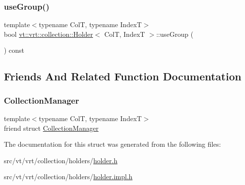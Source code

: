 \subsubsection{\texorpdfstring{use\+Group()}{useGroup()}}
{\footnotesize\ttfamily template$<$typename ColT, typename IndexT$>$ \\
bool \hyperlink{structvt_1_1vrt_1_1collection_1_1_holder}{vt\+::vrt\+::collection\+::\+Holder}$<$ ColT, IndexT $>$\+::use\+Group (\begin{DoxyParamCaption}{ }\end{DoxyParamCaption}) const\hspace{0.3cm}{\ttfamily [inline]}}



\subsection{Friends And Related Function Documentation}
\mbox{\label{structvt_1_1vrt_1_1collection_1_1_holder_af9288b1963f434a90b307b5305a49510}} 
\subsubsection{\texorpdfstring{Collection\+Manager}{CollectionManager}}
{\footnotesize\ttfamily template$<$typename ColT, typename IndexT$>$ \\
friend struct \hyperlink{structvt_1_1vrt_1_1collection_1_1_collection_manager}{Collection\+Manager}\hspace{0.3cm}{\ttfamily [friend]}}



The documentation for this struct was generated from the following files\+:\begin{DoxyCompactItemize}
\item 
src/vt/vrt/collection/holders/\hyperlink{vrt_2collection_2holders_2holder_8h}{holder.\+h}\item 
src/vt/vrt/collection/holders/\hyperlink{holder_8impl_8h}{holder.\+impl.\+h}\end{DoxyCompactItemize}
